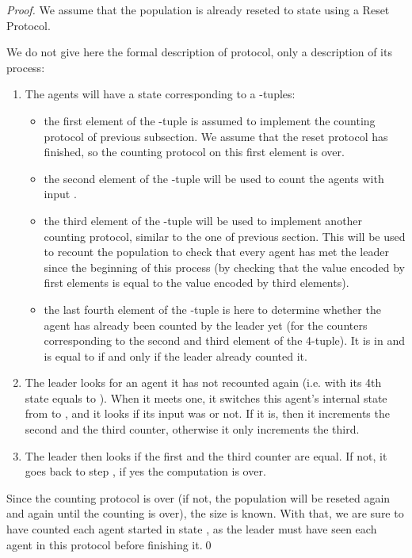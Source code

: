 \documentclass[UKenglish]{llncs}
\begin{document}
\begin{proof}
We assume that the population is already reseted to state  using a Reset Protocol.

We do not give here the formal description of protocol, only a description of its process:
\begin{enumerate}
\item[0.] The agents will have a state corresponding to a -tuples:
  \begin{itemize}
  \item the first element of the -tuple is assumed to implement the
    counting protocol of previous subsection. We assume that the reset
    protocol has finished, so the counting protocol on this
first element is over.
\item the second element of the -tuple will be used to count the agents
  with input .
\item the third element of the -tuple will be used to implement another counting protocol, similar to the one of previous section. This will be used to recount the population to check that
    every agent has met the leader since the beginning of this process
    (by checking that the value encoded by first elements is equal to
    the value encoded by third elements).
\item the last fourth element of the -tuple is
    here to determine whether the agent has already been  counted by the leader
    yet (for the counters corresponding to the second and third
    element of the 4-tuple).  It  is in
     and is equal to  if and only if the leader already
    counted it.
  \end{itemize}


\item The leader looks for an agent it has not recounted again (i.e. with its 4th state equals to ).
When it meets one, it switches this agent's internal state from  to , and it looks if its input was  or not. If it is, then it increments the second and the third counter,
otherwise it only increments  the third.
\item The leader then looks if the first and the third counter are equal. If not, it goes back to 
step , if yes the computation is over.
\end{enumerate}

Since the counting protocol is over (if not, the population will be reseted again and again
until the counting is over), the size is known. With that, we are sure to have counted each agent
started in state , as the leader must have seen each agent in this protocol before
finishing it.\hfill \qed

\end{proof}
\end{document}
